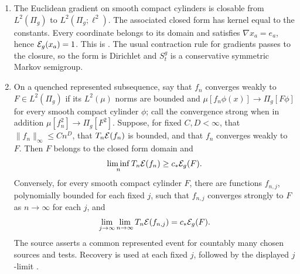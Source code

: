 \begin{proposition}
\begin{enumerate}
      polynomial growth. Spherical coordinates obey the uniform bounds
      \[
       \mu^{\mathrm{sp}}[|x_a|^j]\le C_j(g_{a,n}+b_n)^{-j/2},
       \qquad
       \lim_{m\to\infty}\sup_n\sum_{a>m}(g_{a,n}+b_n)^{-2}=0
      \]
      after discarding finitely many \(n\) on such a representation.
      Here \(\mu^{\mathrm{sp}}\) is surface measure on
      \(\{|\sigma|^2=n\}\), tilted by
      \(\exp(\sigma^{\mathsf T}W\sigma/2)\).
      The sources are \cite[Proposition~2.3 and Corollary~3.3]{FUA}.
\item The Euclidean gradient on smooth compact cylinders is closable
      from \(L^2(\Pi_g)\) to \(L^2(\Pi_g;\ell^2)\). The associated
      closed form has kernel equal to the constants. Every coordinate
      belongs to its domain and satisfies
      \(\nabla x_a=e_a\), hence \(\mathcal E_g(x_a)=1\).
      This is \cite[Proposition~5.1]{FUA}. The usual contraction rule
      for gradients passes to the closure, so the form is Dirichlet
      and \(S_t^g\) is a conservative symmetric Markov semigroup.
\item On a quenched represented subsequence, say that \(f_n\) converges
      weakly to \(F\in L^2(\Pi_g)\) if its \(L^2(\mu)\) norms are bounded
      and
      \(\mu[f_n\phi(x)]\to\Pi_g[F\phi]\) for every smooth compact
      cylinder \(\phi\); call the convergence strong when in addition
      \(\mu[f_n^2]\to\Pi_g[F^2]\). Suppose, for fixed \(C,D<\infty\),
      that \(\|f_n\|_\infty\le Cn^D\), that \(T_n\mathcal E(f_n)\) is bounded,
      and that \(f_n\) converges weakly to \(F\).
      Then \(F\) belongs to the closed form domain and
      \begin{equation}\label{eq:relaxed-liminf}
       \liminf_n T_n\mathcal E(f_n)\ge c_*\mathcal E_g(F).
      \end{equation}
      Conversely, for every smooth compact cylinder \(F\), there are
      functions \(f_{n,j}\), polynomially bounded for each fixed \(j\),
      such that \(f_{n,j}\) converges strongly to \(F\) as \(n\to\infty\)
      for each \(j\), and
      \begin{equation}\label{eq:relaxed-recovery}
       \lim_{j\to\infty}\lim_{n\to\infty}T_n\mathcal E(f_{n,j})
          =c_*\mathcal E_g(F).
      \end{equation}
      The source asserts a common represented event for countably many
      chosen sources and tests. Recovery is used at each fixed \(j\),
      followed by the displayed \(j\)-limit
      \cite[Theorem~6.8]{FUA}.
\end{enumerate}
\end{proposition}

